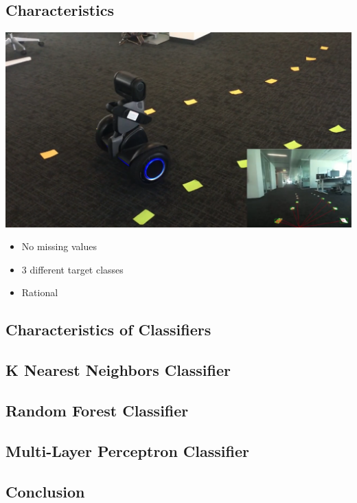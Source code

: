 
\subsection{Characteristics}

\includegraphics[width=\textwidth]{breast/plots/postits.png}

\begin{itemize}
\item No missing values
\item 3 different target classes
\item Rational 
\end{itemize}


\subsection{Characteristics of Classifiers}


\subsection{K Nearest Neighbors Classifier}

\subsection{Random Forest Classifier}

\subsection{Multi-Layer Perceptron Classifier}

\subsection{Conclusion}

